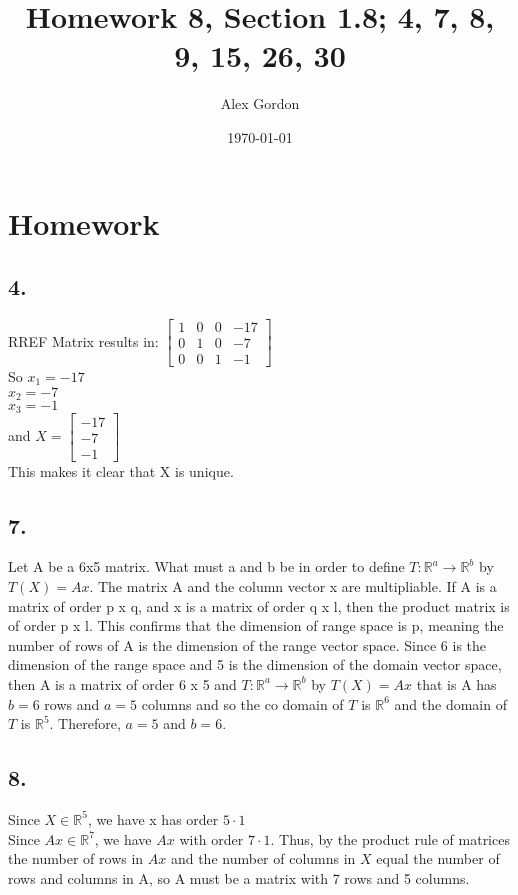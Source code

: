 \documentclass[12]{scrartcl}
\begin{document}
\title{Homework 8, Section 1.8; 4, 7, 8, 9, 15, 26, 30}
\author{Alex Gordon}
\date{\today}
\maketitle
\section*{Homework}
\subsection*{4.}
RREF Matrix results in:
$\begin{bmatrix} 1&0&0&-17 \\0&1&0&-7 \\ 0&0&1&-1  \end{bmatrix}$\\
So $x_1 = -17$\\
$x_2 = -7$\\
$x_3 = -1$\\
and $ X = \begin{bmatrix} -17 \\-7 \\ -1  \end{bmatrix}$\\
This makes it clear that X is unique.
\subsection*{7.}
Let A be a 6x5 matrix. What must a and b be in order to define $T : \mathbb{R}^a \rightarrow \mathbb{R}^b$ by $T(X) = Ax$.
The matrix A and the column vector x are multipliable. If A is a matrix of order p x q, and x is a matrix of order q x l, then the product matrix is of order p x l. 
This confirms that the dimension of range space is p, meaning the number of rows of A is the dimension of the range vector space. 
Since 6 is the dimension of the range space and 5 is the dimension of the domain vector space, then A is a matrix of order 6 x 5 and $T : \mathbb{R}^a \rightarrow \mathbb{R}^b$ by $T(X) = Ax$ that is A has $b = 6$ rows and $a = 5$ columns and so the co domain of $T$ is $\mathbb{R}^6$ and the domain of $T$ is $\mathbb{R}^5$.
Therefore, $a =5$ and $b = 6$.
\subsection*{8.}
Since $X \in \mathbb{R}^5$, we have x has order $ 5 \cdot 1$ \\
Since $Ax \in \mathbb{R}^7$, we have $Ax$ with order $ 7 \cdot 1$.
Thus, by the product rule of matrices the number of rows in $Ax$ and the number of columns in $X$ equal the number of rows and columns in A, so A must be a matrix with 7 rows and 5 columns. 
\end{document}
